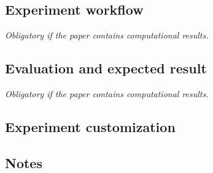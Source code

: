 \documentclass{IEEETran}
\begin{document}
\subsection{Experiment workflow}

{\em Obligatory if the paper contains computational results.}

\subsection{Evaluation and expected result}

{\em Obligatory if the paper contains computational results.}

\subsection{Experiment customization}

\subsection{Notes}

\end{document}
